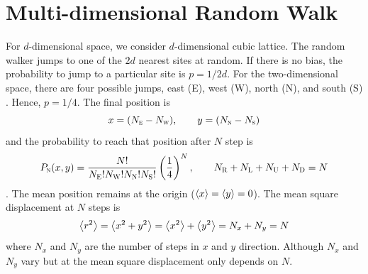 \noindent
\section{Multi-dimensional Random Walk}

For $d$-dimensional space, we consider $d$-dimensional cubic lattice.  The random walker jumps to one of the $2d$ nearest sites at random.
If there is no bias, the probability to jump to a particular site is $p=1/2d$.  For the two-dimensional space, there are four possible jumps, east (E), west (W), north (N), and south (S) .  Hence, $p=1/4$.  The final position is
\begin{equation}
x=(N_\textsc{e}-N_\textsc{w}), \qquad y=(N_\textsc{n}-N_\textsc{s})
\end{equation}
and the probability to reach that position after $N$ step is
%
\begin{equation}
P_\textsc{n}(x,y) = \frac{N!}{N_\textsc{E}! N_\textsc{W}! N_\textsc{N}! N_\textsc{S}!} \left(\frac{1}{4}\right )^N, \qquad N_\textsc{R}+N_\textsc{L}+N_\textsc{U}+N_\textsc{D}=N
\end{equation}.
%
The mean position remains at the origin ($\expval{x}=\expval{y}=0$).  The mean square displacement at $N$ steps is
\begin{equation}\label{eq:msd}
\expval{r^2}=\expval{x^2+y^2} = \expval{x^2}+\expval{y^2} = N_x + N_y = N
\end{equation}
where $N_x$ and $N_y$ are the number of steps in $x$ and $y$ direction.  Although $N_x$ and $N_y$ vary but at the mean square displacement only depends on $N$.  

